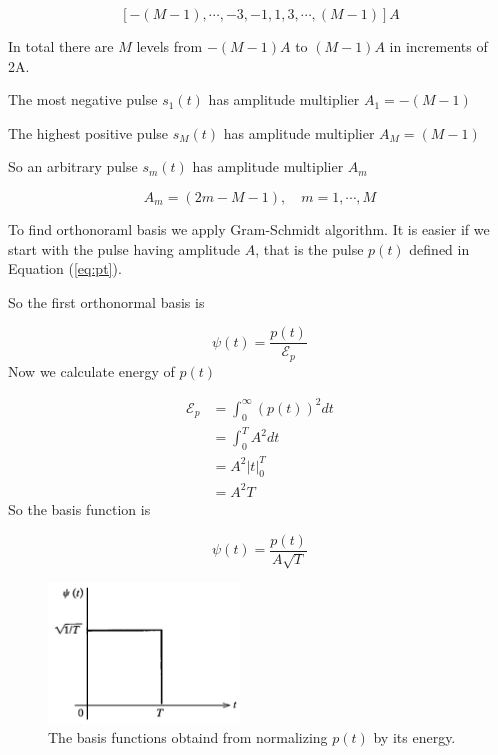 \documentclass[a4paper]{article}
\numberwithin{equation}{subsection}
\begin{document}
	\begin{equation}\label{key}
	[-(M-1), \cdots, -3,-1, 1, 3, \cdots, (M-1)]A
	\end{equation}
	
	
	In total there are $M$ levels from $-(M-1)A$ to $(M-1)A$ in increments of 2A.
	
	The most negative pulse $s_1(t)$ has amplitude multiplier $A_1 = -(M-1)$ 
	
	The highest positive pulse $s_M(t)$ has amplitude multiplier $A_M = (M-1)$ 
	
	So an arbitrary pulse $s_m(t)$ has amplitude multiplier $A_m$
	
	\begin{equation}\label{eq:am}
	A_m = (2m-M-1), \quad m=1,\cdots,M
	\end{equation}
	
	To find orthonoraml basis we apply Gram-Schmidt algorithm. It is easier if we start with the pulse having amplitude $A$, that is the pulse $p(t)$ defined in Equation (\ref{eq:pt}).
	
	
	So the first orthonormal basis is
	
	\begin{equation}\label{key}
	\psi(t)=\frac{p(t)}{\mathcal{E}_p}
	\end{equation}
	Now we calculate energy of $p(t)$
	
	\begin{align}\label{key}
	\mathcal{E}_p&= \int_0^\infty (p(t))^2 dt \nonumber \\
	&= \int_0^T A^2 dt \nonumber \\
	&= A^2 |t|_0^T \nonumber \\
	&= A^2 T
	\end{align}
	So the basis function is 
	
	\begin{equation}\label{key}
	\psi(t)=\frac{p(t)}{A\sqrt{T}}
	\end{equation}
	
	\begin{figure}
		\centering
		\includegraphics[width=2in]{../figures/fig8_7a}
		\caption{The basis functions obtaind from normalizing $p(t)$ by its energy.}
		\label{fig:fig8_7a}
	\end{figure}
	
\end{document}

